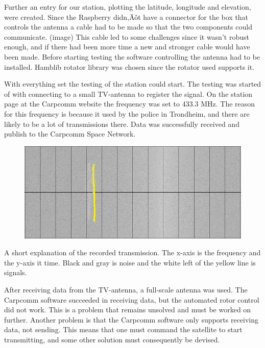 Further an entry for our station, plotting the latitude, longitude and elevation, were created. 
Since the Raspberry didn‚Äôt have a connector for the box that controls the antenna a cable had to be made so that the two components could communicate. (image) 
This cable led to some challenges since it wasn't robust enough, and if there had been more time a new and stronger cable would have been made. Before starting testing the software controlling the antenna had to be installed. Hamblib rotator library was chosen since the rotator used supports it. 

With everything set the testing of the station could start. The testing was started of with connecting to a small TV-antenna to register the signal. On the station page at the Carpcomm website the frequency was set to 433.3 MHz. The reason for this frequency is because it used by the police in Trondheim, and there are likely to be a lot of transmissions there. Data was successfully received and publish to the Carpcomm Space Network.

\begin{figure}
	\centering
	\includegraphics[width=\textwidth]{Figures/sattelite_transmition}
	\label{fig: Transmission}
\end{figure}
A short explanation of the recorded transmission. The x-axis is the frequency and the y-axis it time. Black and gray is noise and the white left of the yellow line is signals.

After receiving data from the TV-antenna, a full-scale antenna was used. The Carpcomm software succeeded in receiving data, but the automated rotor control did not work. This is a problem that remains unsolved and must be worked on further. Another problem is that the Carpcomm software only supports receiving data, not sending. This means that one must command the satellite to start transmitting, and some other solution must consequently be devised. 


